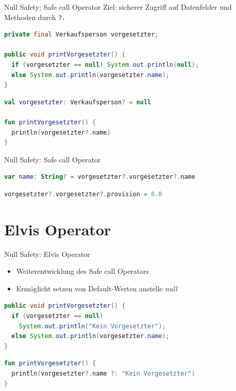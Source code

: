 \documentclass{beamer}
\begin{document}
\begin{frame}[fragile]{Null Safety: Safe call Operator}
  Ziel: sicherer Zugriff auf Datenfelder und Methoden durch \texttt{?.}
  \pause
  \begin{lstlisting}[language=Java, title=in Java]
private final Verkaufsperson vorgesetzter;

public void printVorgesetzter() {
  if (vorgesetzter == null) System.out.println(null);
  else System.out.println(vorgesetzter.name);
}
  \end{lstlisting}
  \pause
  \begin{lstlisting}[language=Kotlin, title=in Kotlin]
val vorgesetzter: Verkaufsperson? = null

fun printVorgesetzter() {
  println(vorgesetzter?.name)
} 
  \end{lstlisting}
\end{frame}

\begin{frame}[fragile]{Null Safety: Safe call Operator}
  \begin{lstlisting}[language=Kotlin, title=Verkettung des Operators]
    var name: String? = vorgesetzter?.vorgesetzter?.name
  \end{lstlisting}
  \pause \vspace{1cm}
  \begin{lstlisting}[language=Kotlin, title=Zuweisungen mit dem Operator]
    vorgesetzter?.vorgesetzter?.provision = 0.0
  \end{lstlisting}
\end{frame}

\section{Elvis Operator}

\begin{frame}[fragile]{Null Safety: Elvis Operator}
  \begin{itemize}[<+->]
    \item Weiterentwicklung des Safe call Operators
    \item Ermöglicht setzen von Default-Werten anstelle \textit{null}
  \end{itemize}
  \pause[\thebeamerpauses]
  \begin{lstlisting}[language=Java]
public void printVorgesetzter() {
  if (vorgesetzter == null)
    System.out.println("Kein Vorgesetzter");
  else System.out.println(vorgesetzter.name);
}
  \end{lstlisting}
  \pause
  \begin{lstlisting}[language=Kotlin]
fun printVorgesetzter() {
  println(vorgesetzter?.name ?: "Kein Vorgesetzter")
}
  \end{lstlisting}
\end{frame}
\end{document}
